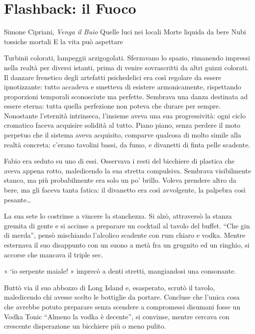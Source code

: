 \chapter{Flashback: il Fuoco}

\begin{chapquote}{Simone Cipriani, \textit{Venga il Buio}}
	Quelle luci nei locali\newline
	Morte liquida da bere\newline
	Nubi tossiche mortali\newline
	E la vita può aspettare
\end{chapquote}

Turbinii colorati, lampeggii arzigogolati. Sferzavano lo spazio, rimanendo impressi nella realtà per diversi istanti, prima di venire sovrascritti da altri guizzi colorati. Il danzare frenetico degli artefatti psichedelici era così regolare da essere ipnotizzante: tutto accadeva e smetteva di esistere armonicamente, rispettando proporzioni temporali sconosciute ma perfette. Sembrava una danza destinata ad essere eterna: tutta quella perfezione non poteva che durare per sempre. Nonostante l'eternità intrinseca, l'insieme aveva una sua progressività: ogni ciclo cromatico faceva acquisire solidità al tutto. Piano piano, senza perdere il moto perpetuo che il sistema aveva acquisito, comparve qualcosa di molto simile alla realtà concreta: c'erano tavolini bassi, da fumo, e divanetti di finta pelle scadente.

Fabio era seduto su uno di essi. Osservava i resti del bicchiere di plastica che aveva appena rotto, maledicendo la sua stretta compulsiva. Sembrava visibilmente stanco, ma più probabilmente era solo un po' brillo. Voleva prendere altro da bere, ma gli faceva tanta fatica: il divanetto era così avvolgente, la palpebra così pesante\ldots

La sua sete lo costrinse a vincere la stanchezza. Si alzò, attraversò la stanza gremita di gente e si accinse a preparare un cocktail al tavolo del buffet. ``Che gin di merda'', pensò mischiando l'alcolico scadente con rum chiaro e vodka. Mentre esternava il suo disappunto con un suono a metà fra un grugnito ed un ringhio, si accorse che mancava il triple sec.

« `io serpente maiale! » imprecò a denti stretti, mangiandosi una consonante.

Buttò via il suo abbozzo di Long Island e, esasperato, scrutò il tavolo, maledicendo chi avesse scelto le bottiglie da portare. Concluse che l'unica cosa che avrebbe potuto preparare senza scendere a compromessi disumani fosse un Vodka Tonic  ``Almeno la vodka è decente'', si convinse, mentre cercava con crescente disperazione un bicchiere più o meno pulito.

